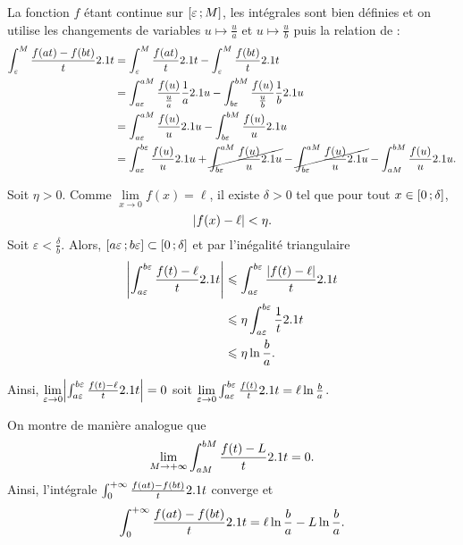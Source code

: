 \begin{solution}
\begin{reponses}
\item La fonction $f$ étant continue sur $\left[\varepsilon\,;M\right]$, les intégrales sont bien définies et on utilise les changements de variables $u \mapsto \frac{u}{a}$ et $u \mapsto \frac{u}{b}$ puis la relation de :
\begin{align*}
\int_\varepsilon^M \frac{f(a t) - f(b t)}{t} 2.1 t
&= \int_\varepsilon^M \frac{f(a t)}{t} 2.1 t - \int_\varepsilon^M \frac{f(b t)}{t} 2.1 t\\
&= \int_{a\varepsilon}^{a M} \frac{f(u)}{\frac{u}{a}} \frac{1}{a} 2.1 u - \int_{b\varepsilon}^{b M} \frac{f(u)}{\frac{u}{b}} \frac{1}{b} 2.1 u\\
&= \int_{a\varepsilon}^{a M} \frac{f(u)}{u} 2.1 u - \int_{b\varepsilon}^{b M} \frac{f(u)}{u} 2.1 u \\
&= \int_{a\varepsilon}^{b\varepsilon} \frac{f(u)}{u} 2.1 u + \cancel{\int_{b\varepsilon}^{aM} \frac{f(u)}{u} 2.1 u} - \cancel{\int_{b\varepsilon}^{aM} \frac{f(u)}{u} 2.1 u} - \int_{aM}^{bM} \frac{f(u)}{u} 2.1 u.
\end{align*}

\item Soit $\eta > 0$. Comme $\lim\limits_{x \to 0} f(x) = \ell$, il existe $\delta > 0$ tel que pour tout $x \in \left[0\,;\delta\right]$,
\[
\mathopen{}\left| f(x) - \ell \right| < \eta.
\]
Soit $\varepsilon < \frac{\delta}{b}$. Alors, $\left[a\varepsilon\,;b\varepsilon\right] \subset \left[0\,;\delta\right]$ et par l'inégalité triangulaire
\begin{align*}
\mathopen{}\left| \int_{a\varepsilon}^{b\varepsilon} \frac{f(t) - \ell}{t} 2.1 t \right|
&\leqslant \int_{a\varepsilon}^{b\varepsilon} \frac{\mathopen{}\left| f(t) - \ell \right|}{t} 2.1 t\\
&\leqslant \eta \int_{a\varepsilon}^{b\varepsilon} \frac{1}{t} 2.1 t\\
&\leqslant \eta \ln\frac{b}{a}.
\end{align*}

Ainsi, $\lim\limits_{\varepsilon\to0} \mathopen{}\left| \int_{a\varepsilon}^{b\varepsilon} \frac{f(t) - \ell}{t} 2.1 t \right| = 0$ soit $\lim\limits_{\varepsilon \to 0} \int_{a\varepsilon}^{b\varepsilon} \frac{f(t)}{t} 2.1 t = \ell \ln \frac{b}{a}$.

\item On montre de manière analogue que
\[
\lim_{M\to+\infty} \int_{aM}^{bM} \frac{f(t) - L}{t} 2.1 t = 0.
\]
Ainsi, l'intégrale $\int_0^{+\infty} \frac{f(a t) - f(b t)}{t} 2.1 t$ converge et
\[
\int_0^{+\infty} \frac{f(a t) - f(b t)}{t} 2.1 t
= \ell \ln\frac{b}{a} - L \ln\frac{b}{a}.
\]
\end{reponses}
\end{solution}


